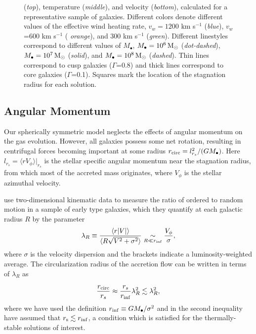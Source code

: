 \documentclass[usenatbib,fleqn]{mn2e}
\newcommand{\Mbh}[1][]{M_{\bullet#1}}
\newcommand{\vwO}{v_{w}}
\begin{document}
\begin{figure}
{    ({\it top}), temperature ({\it middle}), and velocity ({\it bottom}),
    calculated for a representative sample of galaxies.  Different colors
    denote different values of the effective wind heating rate,
    $\vwO=1200$ km s$^{-1}$ ({\it blue}), $\vwO$=600 km s$^{-1}$ ({\it
      orange}), and 300 km s$^{-1}$ ({\it green}).  Different
    linestyles correspond to different values of $\Mbh$, $\Mbh=10^6
    \Msun$ ({\it dot-dashed}), $\Mbh=10^7 \Msun$ ({\it solid}), and
    $\Mbh=10^8 \Msun$ ({\it dashed}). Thin lines correspond to cusp
    galaxies ($\Gamma$=0.8) and thick lines correspond to core
    galaxies ($\Gamma$=0.1). Squares mark the location of
    the stagnation radius for each solution.
 }
\end{figure}

  \subsection{Angular Momentum}
  \label{sec:rotation}

  Our spherically symmetric model neglects the effects of angular
  momentum on the gas evolution.  However, all galaxies possess some
  net rotation, resulting in centrifugal forces becoming important at
  some radius $r_{\rm circ} = l^{2}_{r_{s}}/(GM_{\bullet})$.  Here
  $l_{r_{s}} = \langle r V_{\phi}\rangle |_{r_s}$ is the stellar
  specific angular momentum near the stagnation radius, from which
  most of the accreted mass originates, where $V_{\phi}$ is the
  stellar azimuthal velocity.

  \citet{EmsellemCappellari+:2007a} use two-dimensional kinematic data
  to measure the ratio of ordered to random motion in a sample of
  early type galaxies, which they quantify at each galactic radius $R$
  by the parameter
  \begin{align}
    \lambda_R \equiv \frac{\langle r|V|\rangle}{\langle R\sqrt{V^2+\sigma^2}\rangle} \underset{R \ll r_{\rm inf}}\sim \frac{V_{\phi}}{\sigma},
  \end{align}
  where $\sigma$ is the velocity dispersion and the brackets indicate
  a luminosity-weighted average.  The circularization radius of the
  accretion flow can be written in terms of $\lambda_R$ as

\begin{equation}
\frac{r_{\rm circ}}{r_{s}} \approx \frac{r_{s}}{r_{\rm inf}}\lambda_{R}^{2} \lesssim \lambda_{R}^{2},
\label{eq:rcirc}
\end{equation}
where we have used the definition $r_{\rm inf} \equiv
GM_{\bullet}/\sigma^{2}$ and in the second inequality have assumed
that $r_{\rm s} \lesssim r_{\rm inf}$, a condition which is satisfied
for the thermally-stable solutions of interest.
\end{document}
